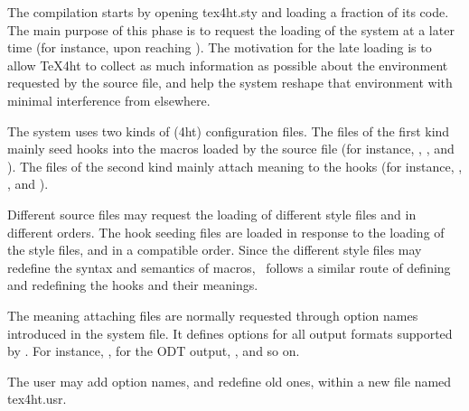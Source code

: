 
The compilation starts by opening tex4ht.sty and loading a fraction of its code.
The main purpose of this phase is to request the loading of the system at a
later time (for instance, upon reaching \texcommand{}). The motivation for
the late loading is to allow TeX4ht to collect as much information as possible
about the environment requested by the source file, and help the system reshape
that environment with minimal interference from elsewhere.

The system uses two kinds of (4ht) configuration files. The files of the first
kind mainly seed hooks into the macros loaded by the source file (for instance,
, , and ).
The files of the second kind mainly
attach meaning to the hooks (for instance, , , and
).

Different source files may request the loading of different style files and in
different orders. The hook seeding files are loaded in response to the loading
of the style files, and in a compatible order. Since the different style files
may redefine the syntax and semantics of macros, \texfourht\ follows a similar route
of defining and redefining the hooks and their meanings.

The meaning attaching files are normally requested through option names
introduced in the  system file. It defines options for all output formats
supported by \texfourht. For instance, ,  for the ODT output,
, and so on.


The user may add option names, and redefine old
ones, within a new file named tex4ht.usr.





